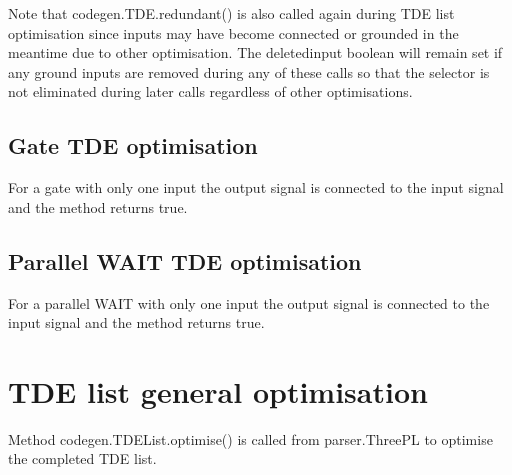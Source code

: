 \documentclass[10pt,a4paper,twoside,fleqn]{book}
\begin{document}
            Note that codegen.TDE.redundant() is also called again during
            TDE list optimisation since inputs may have become connected
            or grounded in the meantime due to other optimisation. The
            deletedinput boolean will remain set if any ground inputs are
            removed during any of these calls so that the selector is not
            eliminated during later calls regardless of other optimisations.
            
        \subsection{Gate TDE optimisation}
        
            For a gate with only one input the output signal is connected to the
            input signal and the method returns true.
        
        \subsection{Parallel WAIT TDE optimisation}
        
            For a parallel WAIT with only one input the output signal is
            connected to the input signal and the method returns true.


    \section{TDE list general optimisation}
    
        Method codegen.TDEList.optimise() is called from parser.ThreePL to
        optimise the completed TDE list.
        
\end{document}
